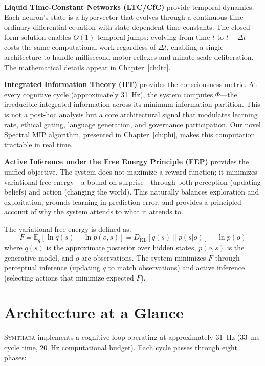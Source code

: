 \documentclass[12pt]{book}
\newcommand{\symthaea}{\textsc{Symthaea}}
\newcommand{\E}{\mathbb{E}}
\begin{document}
\textbf{Liquid Time-Constant Networks (LTC/CfC)} provide temporal dynamics. Each neuron's state is a hypervector that evolves through a continuous-time ordinary differential equation with state-dependent time constants. The closed-form solution enables $O(1)$ temporal jumps: evolving from time $t$ to $t + \Delta t$ costs the same computational work regardless of $\Delta t$, enabling a single architecture to handle millisecond motor reflexes and minute-scale deliberation. The mathematical details appear in Chapter~\ref{ch:ltc}.

\textbf{Integrated Information Theory (IIT)} provides the consciousness metric. At every cognitive cycle (approximately 31~Hz), the system computes $\Phi$---the irreducible integrated information across its minimum information partition. This is not a post-hoc analysis but a core architectural signal that modulates learning rate, ethical gating, language generation, and governance participation. Our novel Spectral MIP algorithm, presented in Chapter~\ref{ch:phi}, makes this computation tractable in real time.

\textbf{Active Inference under the Free Energy Principle (FEP)} provides the unified objective. The system does not maximize a reward function; it minimizes variational free energy---a bound on surprise---through both perception (updating beliefs) and action (changing the world). This naturally balances exploration and exploitation, grounds learning in prediction error, and provides a principled account of why the system attends to what it attends to.

The variational free energy is defined as:
\begin{equation}\label{eq:fep}
F = \E_q\!\left[\ln q(s) - \ln p(o, s)\right] = D_{\text{KL}}[q(s) \| p(s|o)] - \ln p(o)
\end{equation}
where $q(s)$ is the approximate posterior over hidden states, $p(o, s)$ is the generative model, and $o$ are observations. The system minimizes $F$ through perceptual inference (updating $q$ to match observations) and active inference (selecting actions that minimize expected $F$).

\section{Architecture at a Glance}

\symthaea{} implements a cognitive loop operating at approximately 31~Hz (33~ms cycle time, 20~Hz computational budget). Each cycle passes through eight phases:
\end{document}

